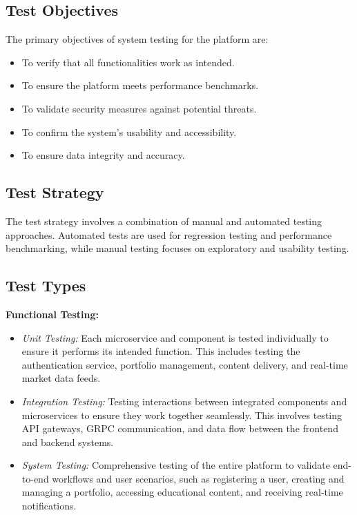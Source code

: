 \documentclass[12pt]{report}
\begin{document}
\subsection{Test Objectives}

The primary objectives of system testing for the platform are:
\begin{itemize}
    \item To verify that all functionalities work as intended.
    \item To ensure the platform meets performance benchmarks.
    \item To validate security measures against potential threats.
    \item To confirm the system's usability and accessibility.
    \item To ensure data integrity and accuracy.
\end{itemize}

\subsection{Test Strategy}

The test strategy involves a combination of manual and automated testing approaches. Automated tests are used for regression testing and performance benchmarking, while manual testing focuses on exploratory and usability testing.

\subsection{Test Types}

\textbf{Functional Testing:}
\begin{itemize}
    \item \textit{Unit Testing:} Each microservice and component is tested individually to ensure it performs its intended function. This includes testing the authentication service, portfolio management, content delivery, and real-time market data feeds.
    \item \textit{Integration Testing:} Testing interactions between integrated components and microservices to ensure they work together seamlessly. This involves testing API gateways, GRPC communication, and data flow between the frontend and backend systems.
    \item \textit{System Testing:} Comprehensive testing of the entire platform to validate end-to-end workflows and user scenarios, such as registering a user, creating and managing a portfolio, accessing educational content, and receiving real-time notifications.
\end{itemize}
\end{document}
